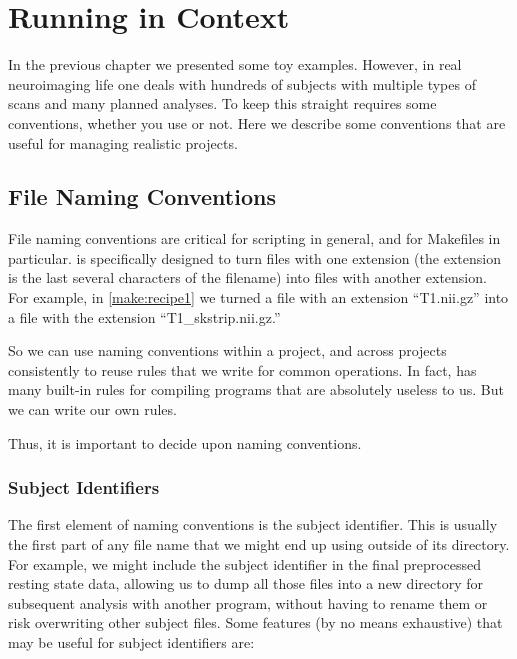 \chapter{Running \maken{} in Context}
\label{chap:context}

In the previous chapter we presented some toy examples. However, in real neuroimaging life one deals with hundreds of subjects with multiple types of scans and many planned analyses. To keep this straight requires some conventions, whether you use \maken{} or not. Here we describe some conventions that are useful for managing realistic projects.

\section{File Naming Conventions}
\label{sec:naming}

File naming conventions are critical for scripting in general, and for Makefiles in particular. \maken{} is specifically designed to turn files with one extension (the extension is the last several characters of the filename) into files with another extension. For example, in \autoref{make:recipe1} we turned a file with an extension ``T1.nii.gz'' into a file with the extension ``T1_skstrip.nii.gz.'' 

So we can use naming conventions within a project, and across projects consistently to reuse rules that we write for common operations. In fact, \maken{} has many built-in rules for compiling programs that are absolutely useless to us. But we can write our own rules.

Thus, it is important to decide upon naming conventions. 

\subsection{Subject Identifiers}

The first element of naming conventions is the subject identifier. This is usually the first part of any file name that we might end up using outside of its directory. For example, we might include the subject identifier in the final preprocessed resting state data, allowing us to dump all those files into a new directory for subsequent analysis with another program, without having to rename them or risk overwriting other subject files. Some features (by no means exhaustive) that may be useful for subject identifiers are:

